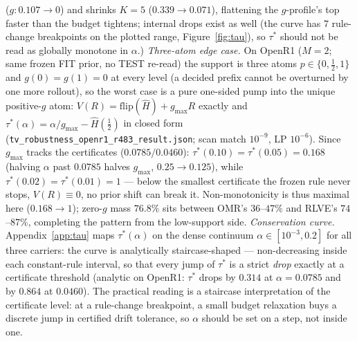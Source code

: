 \documentclass{article}
\theoremstyle{definition}
\theoremstyle{remark}
\newcommand{\flip}{\mathrm{flip}}
\begin{document}
($g:0.107\!\to\!0$) and shrinks $K{=}5$ ($0.339\!\to\!0.071$), flattening
the $g$-profile's top faster than the budget tightens; internal drops
exist as well (the curve has $7$ rule-change breakpoints on the plotted
range, Figure~\ref{fig:tau}), so $\tau^*$ should not be read as globally
monotone in $\alpha$.)
\emph{Three-atom edge case.} On OpenR1 ($M{=}2$; same frozen FIT prior, no
TEST re-read) the support is three atoms $p\in\{0,\tfrac12,1\}$ and
$g(0)=g(1)=0$ at every level (a decided prefix cannot be overturned by one
more rollout), so the worst case is a pure one-sided pump into the unique
positive-$g$ atom: $V(R)=\flip(\widehat H)+g_{\max}R$ exactly and
$\tau^*(\alpha)=\alpha/g_{\max}-\widehat H(\tfrac12)$ in closed form
(\texttt{tv\_robustness\_openr1\_r483\_result.json}; scan match $10^{-9}$,
LP $10^{-6}$). Since $g_{\max}$ tracks the certificates ($0.0785/0.0460$):
$\tau^*(0.10)=\tau^*(0.05)=0.168$ (halving $\alpha$ past $0.0785$ halves
$g_{\max}$, $0.25\!\to\!0.125$), while $\tau^*(0.02)=\tau^*(0.01)=1$ ---
below the smallest certificate the frozen rule never stops, $V(R)\equiv0$,
no prior shift can break it. Non-monotonicity is thus maximal here
($0.168\!\to\!1$); zero-$g$ mass $76.8\%$ sits between OMR's $36$--$47\%$
and RLVE's $74$--$87\%$, completing the pattern from the low-support side.
\emph{Conservation curve.} Appendix~\ref{app:tau} maps
$\tau^*(\alpha)$ on the dense continuum $\alpha\in[10^{-3},0.2]$ for all
three carriers: the curve is analytically staircase-shaped ---
non-decreasing inside each constant-rule interval, so that every jump of
$\tau^*$ is a strict \emph{drop} exactly at a certificate threshold
(analytic on OpenR1: $\tau^*$ drops by $0.314$ at $\alpha=0.0785$ and by
$0.864$ at $0.0460$). The practical reading is a
staircase interpretation of the certificate level: at a rule-change
breakpoint, a small budget relaxation buys a discrete jump in certified
drift tolerance, so $\alpha$ should be set on a step, not inside one.
\end{document}
